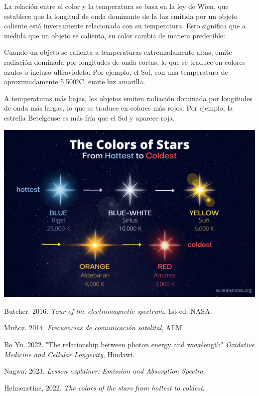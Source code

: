 \documentclass[a4paper,12pt]{article}
\newenvironment{Figure}
  {\par\medskip\noindent\minipage{\linewidth}}
  {\endminipage\par\medskip}
\begin{document}
\begin{multicols*}{2}
La relación entre el color y la temperatura se basa en la ley de Wien, que establece que la longitud de onda dominante de la luz emitida por un objeto caliente está inversamente relacionada con su temperatura. Esto significa que a medida que un objeto se calienta, su color cambia de manera predecible:

Cuando un objeto se calienta a temperaturas extremadamente altas, emite radiación dominada por longitudes de onda cortas, lo que se traduce en colores azules o incluso ultravioleta. Por ejemplo, el Sol, con una temperatura de aproximadamente 5,500°C, emite luz amarilla.

A temperaturas más bajas, los objetos emiten radiación dominada por longitudes de onda más largas, lo que se traduce en colores más rojos. Por ejemplo, la estrella Betelgeuse es más fría que el Sol y aparece roja.

\begin{Figure}
    \centering
    \includegraphics[width=0.9\linewidth]{tempColor.png}
    \label{fig: tempColor}
\end{Figure}

\begin{thebibliography}{99}

\bibitem{} Butcher. 2016. \emph{Tour of the electromagnetic spectrum}, 1st ed. NASA.

\bibitem{} Muñoz. 2014. \emph{Frecuencias de comunicación satelital}, AEM.

\bibitem{} Bo Yu. 2022. "The relationship between photon energy and wavelength" \emph{Oxidative Medicine and Cellular Longevity}, Hindawi.

\bibitem{} Nagwa. 2023. \emph{Lesson explainer: Emission and Absorption Spectra}. 

\bibitem{} Helmenstine, 2022. \emph{The colors of the stars from hottest to coldest}.

\end{thebibliography}

\end{multicols*}
\end{document}
